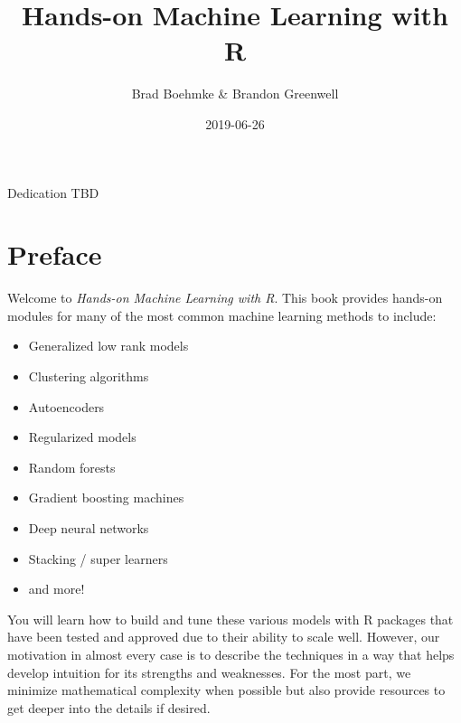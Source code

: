 \documentclass[]{krantz}
\title{Hands-on Machine Learning with R}
\author{Brad Boehmke \& Brandon Greenwell}
\date{2019-06-26}
\providecommand{\tightlist}{%
  \setlength{\itemsep}{0pt}\setlength{\parskip}{0pt}}
\begin{document}
\maketitle


\thispagestyle{empty}

\begin{center}
Dedication TBD
\end{center}

\setlength{\abovedisplayskip}{-5pt}
\setlength{\abovedisplayshortskip}{-5pt}

{
\hypersetup{linkcolor=}
\setcounter{tocdepth}{2}
\tableofcontents
}
\listoftables
\listoffigures
\hypertarget{preface}{%
\chapter*{Preface}\label{preface}}


Welcome to \emph{Hands-on Machine Learning with R}. This book provides hands-on modules for many of the most common machine learning methods to include:

\begin{itemize}
\tightlist
\item
  Generalized low rank models
\item
  Clustering algorithms
\item
  Autoencoders
\item
  Regularized models
\item
  Random forests
\item
  Gradient boosting machines
\item
  Deep neural networks
\item
  Stacking / super learners
\item
  and more!
\end{itemize}

You will learn how to build and tune these various models with R packages that have been tested and approved due to their ability to scale well. However, our motivation in almost every case is to describe the techniques in a way that helps develop intuition for its strengths and weaknesses. For the most part, we minimize mathematical complexity when possible but also provide resources to get deeper into the details if desired.
\end{document}
